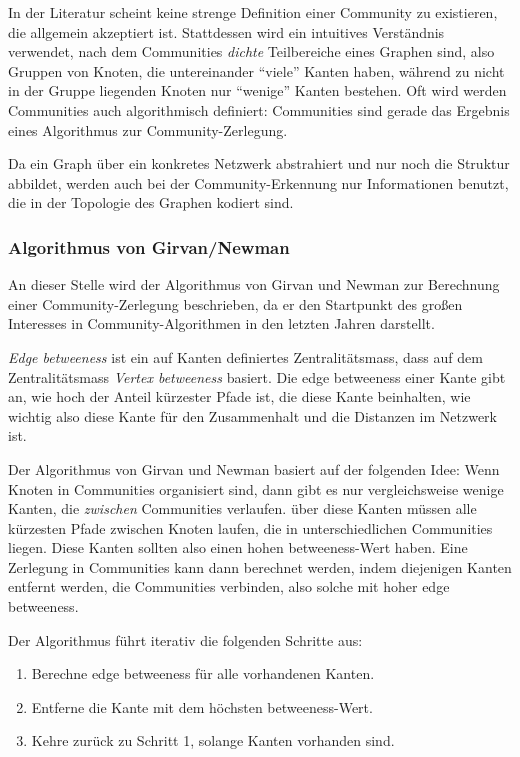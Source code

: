 In der Literatur scheint keine strenge Definition einer Community zu
existieren, die allgemein akzeptiert ist. Stattdessen wird ein
intuitives Verständnis verwendet, nach dem Communities \emph{dichte}
Teilbereiche eines Graphen sind, also Gruppen von Knoten, die
untereinander ``viele'' Kanten haben, während zu nicht in der Gruppe
liegenden Knoten nur ``wenige'' Kanten bestehen. Oft wird werden
Communities auch algorithmisch definiert: Communities sind gerade das
Ergebnis eines Algorithmus zur Community-Zerlegung.

Da ein Graph über ein konkretes Netzwerk abstrahiert und nur noch
die Struktur abbildet, werden auch bei der Community-Erkennung nur
Informationen benutzt, die in der Topologie des Graphen kodiert sind. 

\subsubsection{Algorithmus von Girvan/Newman}
\label{sec:algor-von-girv-1}

An dieser Stelle wird der Algorithmus von Girvan
und Newman\cite{Newman2004} zur Berechnung einer Community-Zerlegung
beschrieben, da er den Startpunkt des großen Interesses in
Community-Algorithmen in den letzten Jahren darstellt.

\emph{Edge betweeness} ist ein auf Kanten definiertes
Zentralitätsmass, dass auf dem Zentralitätsmass \emph{Vertex
  betweeness}\cite{Koschutzki2004a} basiert. Die edge betweeness
einer Kante gibt an, wie hoch der Anteil kürzester Pfade ist, die
diese Kante beinhalten, wie wichtig also diese Kante für den
Zusammenhalt und die Distanzen im Netzwerk ist.

Der Algorithmus von Girvan und Newman basiert auf der folgenden Idee:
Wenn Knoten in Communities organisiert sind, dann gibt es nur
vergleichsweise wenige Kanten, die \emph{zwischen} Communities
verlaufen. über diese Kanten müssen alle kürzesten Pfade
zwischen Knoten laufen, die in unterschiedlichen Communities
liegen. Diese Kanten sollten also einen hohen betweeness-Wert
haben. Eine Zerlegung in Communities kann dann berechnet werden, indem
diejenigen Kanten entfernt werden, die Communities verbinden, also
solche mit hoher edge betweeness.

Der Algorithmus führt iterativ die folgenden Schritte aus:

\begin{enumerate}
\item Berechne edge betweeness für alle vorhandenen Kanten.
\item Entferne die Kante mit dem höchsten betweeness-Wert.
\item Kehre zurück zu Schritt 1, solange Kanten vorhanden sind.
\end{enumerate}

